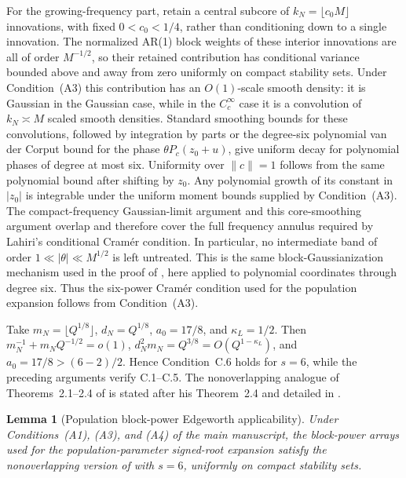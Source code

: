 \documentclass[12pt]{article}
\newtheorem{Lemma}[Proposition]{Lemma}
\theoremstyle{remark}
\begin{document}
For the growing-frequency part, retain a central subcore of $k_N=\lfloor c_0M\rfloor$ innovations, with fixed $0<c_0<1/4$, rather than conditioning down to a single innovation. The normalized AR(1) block weights of these interior innovations are all of order $M^{-1/2}$, so their retained contribution has conditional variance bounded above and away from zero uniformly on compact stability sets. Under Condition~(A3) this contribution has an $O(1)$-scale smooth density: it is Gaussian in the Gaussian case, while in the $C_c^\infty$ case it is a convolution of $k_N\asymp M$ scaled smooth densities. Standard smoothing bounds for these convolutions, followed by integration by parts or the degree-six polynomial van der Corput bound for the phase $\theta P_c(z_0+u)$, give uniform decay for polynomial phases of degree at most six. Uniformity over $\|c\|=1$ follows from the same polynomial bound after shifting by $z_0$. Any polynomial growth of its constant in $|z_0|$ is integrable under the uniform moment bounds supplied by Condition~(A3). The compact-frequency Gaussian-limit argument and this core-smoothing argument overlap and therefore cover the full frequency annulus required by Lahiri's conditional Cram\'er condition. In particular, no intermediate band of order $1\ll |\theta|\ll M^{1/2}$ is left untreated. This is the same block-Gaussianization mechanism used in the proof of \citet[Theorem~3.2]{Lahiri:2007}, here applied to polynomial coordinates through degree six. Thus the six-power Cram\'er condition used for the population expansion follows from Condition~(A3).

Take $m_N=\lfloor Q^{1/8}\rfloor$, $d_N=Q^{1/8}$, $a_0=17/8$, and $\kappa_L=1/2$. Then $m_N^{-1}+m_NQ^{-1/2}=o(1)$, $d_N^2m_N=Q^{3/8}=O(Q^{1-\kappa_L})$, and $a_0=17/8>(6-2)/2$. Hence Condition~C.6 holds for $s=6$, while the preceding arguments verify C.1--C.5. The nonoverlapping analogue of Theorems~2.1--2.4 of \citet{Lahiri:2007} is stated after his Theorem~2.4 and detailed in \citet{Lahiri:2006preprint}.

\begin{Lemma}[Population block-power Edgeworth applicability]
\label{lem:supp-knownparam-edgeworth-applicability}
Under Conditions~(A1), (A3), and (A4) of the main manuscript, the block-power arrays used for the population-parameter signed-root expansion satisfy the nonoverlapping version of \citet[Theorem~2.1]{Lahiri:2007} with $s=6$, uniformly on compact stability sets.
\end{Lemma}
\end{document}
